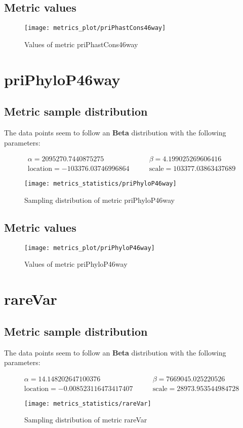 \documentclass[\main/main.tex]{subfiles}
\begin{document}
\subsection{Metric values}
\begin{figure}
  \texttt{[image: metrics\_plot/priPhastCons46way]}
  \caption{Values of metric priPhastCons46way}
\end{figure}

\clearpage
\section{priPhyloP46way}
\subsection{Metric sample distribution}
The data points seem to follow an \textbf{Beta} distribution with the following parameters:

\begin{align*}
  \alpha   = 2095270.7440875275         & \qquad  \beta = 4.199025269606416        \\
  \text{location} = -103376.03746996864 & \qquad \text{scale} = 103377.03863437689
\end{align*}
\begin{figure}
  \texttt{[image: metrics\_statistics/priPhyloP46way]}
  \caption{Sampling distribution of metric priPhyloP46way}
\end{figure}
\subsection{Metric values}
\begin{figure}
  \texttt{[image: metrics\_plot/priPhyloP46way]}
  \caption{Values of metric priPhyloP46way}
\end{figure}

\clearpage
\section{rareVar}
\subsection{Metric sample distribution}
The data points seem to follow an \textbf{Beta} distribution with the following parameters:

\begin{align*}
  \alpha   = 14.148202647100376           & \qquad  \beta = 7669045.025220526        \\
  \text{location} = -0.008523116473417407 & \qquad \text{scale} = 28973.953544984728
\end{align*}
\begin{figure}
  \texttt{[image: metrics\_statistics/rareVar]}
  \caption{Sampling distribution of metric rareVar}
\end{figure}
\end{document}
